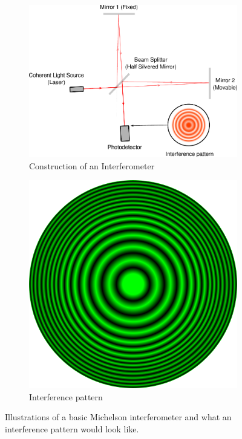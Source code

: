 \documentclass[12pt]{article}
\begin{document}
\begin{figure}[H]
  \centering
  \begin{subfigure}[t]{0.4\textwidth}
    \centering
    \includegraphics[width=\textwidth]{images/interferometer.pdf}
    \caption{Construction of an Interferometer}
    \label{fig:interferometer}
  \end{subfigure}
  \hspace{25px}
  \begin{subfigure}[t]{0.25\textwidth}
    \centering
    \includegraphics[width=\textwidth]{images/interference_pattern.png}
    \caption{Interference pattern}
    \label{fig:sinusoidal_fringes}
  \end{subfigure}
  \caption{Illustrations of a basic Michelson interferometer \cite{Stannered_Interferometer_2007,wiredsense_michelson_guide} and what an interference pattern would look like.}
\end{figure}
\end{document}
